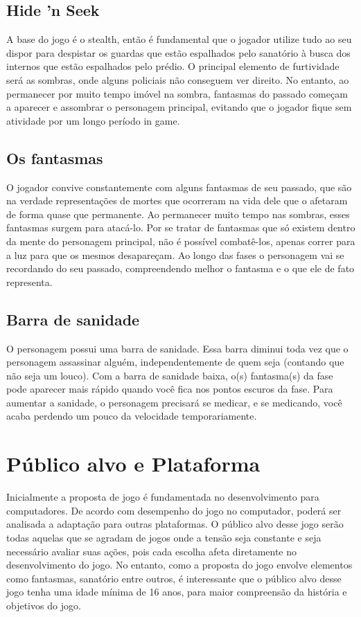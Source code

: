 \documentclass{article}
\begin{document}
\subsection{Hide 'n Seek}
A base do jogo é o stealth, então é fundamental que o jogador utilize tudo ao seu dispor para despistar os guardas que estão espalhados pelo sanatório à busca dos internos que estão espalhados pelo prédio. O principal elemento de furtividade será as sombras, onde alguns policiais não conseguem ver direito. No entanto, ao permanecer por muito tempo imóvel na sombra, fantasmas do passado começam a aparecer e assombrar o personagem principal, evitando que o jogador fique sem atividade por um longo período in game.

\subsection{Os fantasmas}
O jogador convive constantemente com alguns fantasmas de seu passado, que são na verdade representações de mortes que ocorreram na vida dele que o afetaram de forma quase que permanente. Ao permanecer muito tempo nas sombras, esses fantasmas surgem para atacá-lo. Por se tratar de fantasmas que só existem dentro da mente do personagem principal, não é possível combatê-los, apenas correr para a luz para que os mesmos desapareçam. Ao longo das fases o personagem vai se recordando do seu passado, compreendendo melhor o fantasma e o que ele de fato representa.

\subsection{Barra de sanidade}
O personagem possui uma barra de sanidade. Essa barra diminui toda vez que o personagem assassinar alguém, independentemente de quem seja (contando que não seja um louco). Com a barra de sanidade baixa, o(s) fantasma(s) da fase pode aparecer mais rápido quando você fica nos pontos escuros da fase. Para aumentar a sanidade, o personagem precisará se medicar, e se medicando, você acaba perdendo um pouco da velocidade temporariamente. 

\section{Público alvo e Plataforma}
Inicialmente a proposta de jogo é fundamentada no desenvolvimento para computadores. De acordo com desempenho do jogo no computador, poderá ser analisada a adaptação para outras plataformas.
O público alvo desse jogo serão todas aquelas que se agradam de jogos onde a tensão seja constante e seja necessário avaliar suas ações, pois cada escolha afeta diretamente no desenvolvimento do jogo. No entanto, como a proposta do jogo envolve elementos como fantasmas, sanatório entre outros, é interessante que o público alvo desse jogo tenha uma idade mínima de 16 anos, para maior compreensão da história e objetivos do jogo.
\end{document}

